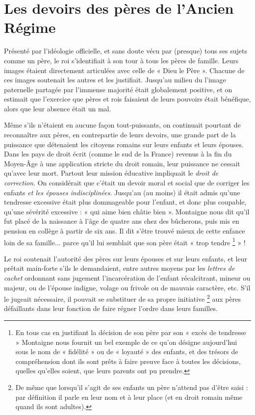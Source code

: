 
\chapter{Les devoirs des pères de l'Ancien Régime}


 Présenté par l'idéologie officielle, et sans doute vécu par (presque) tous ses sujets comme un père, le roi s'identifiait à son tour à tous les pères de famille. Leurs images étaient directement articulées avec celle de « Dieu le Père ». Chacune de ces images soutenait les autres et les justifiait. Jusqu'au milieu du  l'image paternelle partagée par l'immense majorité était globalement positive, et on estimait que l'exercice que pères et rois faisaient de leurs pouvoirs était bénéfique, alors que leur absence était un mal.

 Même s'ils n'étaient en aucune façon tout-puissants, on continuait pourtant de reconnaître aux pères, en contrepartie de leurs devoirs, une grande part de la puissance que détenaient les citoyens romains sur leurs enfants et leurs épouses. Dans les pays de droit écrit (comme le sud de la France) revenus à la fin du Moyen-Âge à une application stricte du droit romain, leur puissance ne cessait qu'avec leur mort. Partout leur mission éducative impliquait le \emph{droit de correction}. On considérait que c'était un devoir moral et social que de corriger les enfants \emph{et les épouses indisciplinées}. Jusqu'au  (au moins) il était admis qu'une tendresse excessive était plus dommageable pour l'enfant, et donc plus coupable, qu'une sévérité excessive : « {qui aime bien châtie bien} ». Montaigne nous dit qu'il fut placé de la naissance à l'âge de quatre ans chez des bûcherons, puis mis en pension en collège à partir de six ans. Il dit s'être trouvé mieux de cette enfance loin de sa famille... parce qu'il lui semblait que son père était « trop tendre%
\footnote{En tous cas en justifiant la décision de son père par son « excès de tendresse » Montaigne nous fournit un bel exemple de ce qu'on désigne aujourd'hui sous le nom de « fidélité » ou de « loyauté » des enfants, et des trésors de compréhension dont ils sont prêts à faire preuve face à toutes les décisions, quelles qu'elles soient, que leurs parents ont pu prendre.} 
» !

 Le roi soutenait l'autorité des pères sur leurs épouses et sur leurs enfants, et leur prêtait main-forte s'ils le demandaient, entre autres moyens par les \emph{lettres de cachet} ordonnant sans jugement l'incarcération de l'enfant récalcitrant, mineur ou majeur, ou de l'épouse indigne, volage ou frivole ou de mauvais caractère, etc. S'il le jugeait nécessaire, il pouvait se substituer de sa propre initiative%
\footnote{De même que lorsqu'il s'agit de ses enfants un père n'attend pas d'être saisi : par définition il parle en leur nom et à leur place (et en droit romain même quand ils sont adultes).} 
aux pères défaillants dans leur fonction de faire régner l'ordre dans leurs familles. 

